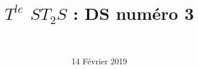 \documentclass[a4paper,11pt]{exam}
\author{\ }
\date{14 Février 2019}
\title{$T^{le}$ $ST_2S$ : DS num\'ero 3}
\begin{document}
%	

	\maketitle





%






%

\newpage



%

\label{LastPage}
	
\end{document}
